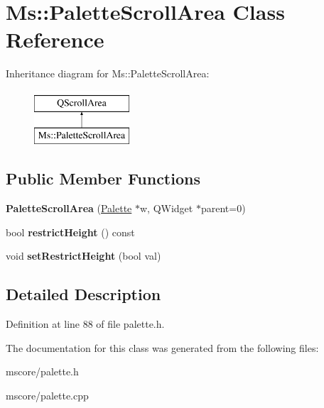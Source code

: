 \hypertarget{class_ms_1_1_palette_scroll_area}{}\section{Ms\+:\+:Palette\+Scroll\+Area Class Reference}
\label{class_ms_1_1_palette_scroll_area}
Inheritance diagram for Ms\+:\+:Palette\+Scroll\+Area\+:\begin{figure}[H]
\begin{center}
\leavevmode
\includegraphics[height=2.000000cm]{class_ms_1_1_palette_scroll_area}
\end{center}
\end{figure}
\subsection*{Public Member Functions}
\begin{DoxyCompactItemize}
\item 
\mbox{\label{class_ms_1_1_palette_scroll_area_a193ac2668dc2eb3e908061d5d82866fc}} 
{\bfseries Palette\+Scroll\+Area} (\hyperlink{class_ms_1_1_palette}{Palette} $\ast$w, Q\+Widget $\ast$parent=0)
\item 
\mbox{\label{class_ms_1_1_palette_scroll_area_a7adcf9c7df08152b5e9adc3bdf5aece4}} 
bool {\bfseries restrict\+Height} () const
\item 
\mbox{\label{class_ms_1_1_palette_scroll_area_a1a08fca3abff6bb4f3e850de7102dee8}} 
void {\bfseries set\+Restrict\+Height} (bool val)
\end{DoxyCompactItemize}


\subsection{Detailed Description}


Definition at line 88 of file palette.\+h.



The documentation for this class was generated from the following files\+:\begin{DoxyCompactItemize}
\item 
mscore/palette.\+h\item 
mscore/palette.\+cpp\end{DoxyCompactItemize}
